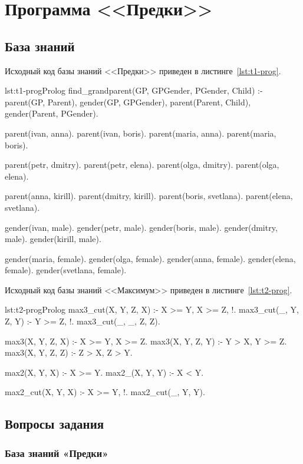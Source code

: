 \section{Программа <<Предки>>}

\subsection{База знаний}
Исходный код базы знаний <<Предки>> приведен в листинге~\ref{lst:t1-prog}.
\begin{listing}{lst:t1-prog}{Prolog}
find_grandparent(GP, GPGender, PGender, Child) :- 
    parent(GP, Parent),
    gender(GP, GPGender),
    parent(Parent, Child),
    gender(Parent, PGender).

parent(ivan, anna).
parent(ivan, boris).
parent(maria, anna).
parent(maria, boris).

parent(petr, dmitry).
parent(petr, elena).
parent(olga, dmitry).
parent(olga, elena).

parent(anna, kirill).
parent(dmitry, kirill).
parent(boris, svetlana).
parent(elena, svetlana).

gender(ivan, male).
gender(petr, male).
gender(boris, male).
gender(dmitry, male).
gender(kirill, male).

gender(maria, female).
gender(olga, female).
gender(anna, female).
gender(elena, female).
gender(svetlana, female).
\end{listing}

Исходный код базы знаний <<Максимум>> приведен в листинге~\ref{lst:t2-prog}.
\begin{listing}{lst:t2-prog}{Prolog}
max3_cut(X, Y, Z, X) :- X >= Y, X >= Z, !.
max3_cut(_, Y, Z, Y) :- Y >= Z, !.
max3_cut(_, _, Z, Z).

max3(X, Y, Z, X) :- X >= Y, X >= Z.
max3(X, Y, Z, Y) :- Y > X,  Y >= Z.
max3(X, Y, Z, Z) :- Z > X,  Z > Y.

max2(X, Y, X) :- X >= Y.
max2_(X, Y, Y) :- X < Y.

max2_cut(X, Y, X) :- X >= Y, !.
max2_cut(_, Y, Y).
\end{listing}

\subsection{Вопросы задания}

\subsubsection{База знаний «Предки»}

